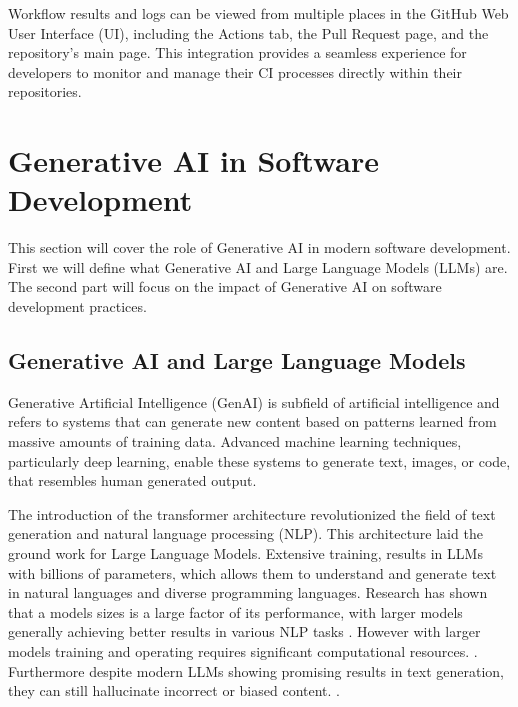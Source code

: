 Workflow results and logs can be viewed from multiple places in the GitHub Web User Interface (UI), including the Actions tab, the Pull Request page, and the repository's main page. This integration provides a seamless experience for developers to monitor and manage their CI processes directly within their repositories. \cite{GitHubActions2025}

\section{Generative AI in Software Development}

This section will cover the role of Generative AI in modern software development. First we will define what Generative AI and Large Language Models (LLMs) are. The second part will focus on the impact of Generative AI on software development practices.

\subsection{Generative AI and Large Language Models}
Generative Artificial Intelligence (GenAI) is subfield of artificial intelligence and refers to systems that can generate new content based on patterns learned from massive amounts of training data. Advanced machine learning techniques, particularly deep learning, enable these systems to generate text, images, or code, that resembles human generated output. \cite{WhatGenerativeAI2021}

The introduction of the transformer architecture revolutionized the field of text generation and natural language processing (NLP). This architecture laid the ground work for Large Language Models. \cite{changSurveyEvaluationLarge2024, naveedComprehensiveOverviewLarge2024} Extensive training, results in LLMs with billions of parameters, which allows them to understand and generate text in natural languages and diverse programming languages. Research has shown that a models sizes is a large factor of  its performance, with larger models generally achieving better results in various NLP tasks \cite{kaplanScalingLawsNeural2020}. However with larger models training and operating requires significant computational resources. \cite{LLMsWhatsLarge, naveedComprehensiveOverviewLarge2024}. Furthermore despite modern LLMs showing promising results in text generation, they can still hallucinate incorrect or biased content. \cite{LLMsWhatsLarge}.

